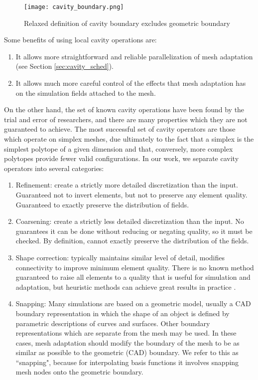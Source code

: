 \begin{figure}
\begin{center}
\texttt{[image: cavity\_boundary.png]}
\caption{Relaxed definition of cavity boundary excludes geometric boundary}
\label{fig:cavity_boundary}
\end{center}
\end{figure}

Some benefits of using local cavity operations are:
\begin{enumerate}
\item It allows more straightforward and reliable parallelization of
mesh adaptation (see Section \ref{sec:cavity_sched}).
\item It allows much more careful control of the effects that mesh
adaptation has on the simulation fields attached to the mesh.
\end{enumerate}

On the other hand, the set of known cavity operations
have been found by the trial and error of researchers,
and there are many properties which they are not guaranteed to
achieve.
The most successful set of cavity operators are those
which operate on simplex meshes, due ultimately to the
fact that a simplex is the simplest polytope of a given dimension
and that, conversely, more complex polytopes provide fewer
valid configurations.
In our work, we separate cavity operators into several categories:
\begin{enumerate}
\item Refinement: create a strictly more detailed discretization
than the input. Guaranteed not to invert elements, but not to
preserve any element quality. Guaranteed to exactly preserve
the distribution of fields.
\item Coarsening: create a strictly less detailed discretization
than the input. No guarantees it can be done without reducing
or negating quality, so it must be checked.
By definition, cannot exactly preserve the distribution of the fields.
\item Shape correction: typically maintains similar level of detail,
modifies connectivity to improve minimum element quality.
There is no known method guaranteed to raise all elements to a quality
that is useful for simulation and adaptation, but heuristic
methods can achieve great results in practice \cite{klingner2008aggressive}.
\item Snapping: Many simulations are based on a geometric model, usually a CAD
boundary representation in which the shape of an object is defined
by parametric descriptions of curves and surfaces.
Other boundary representations which are separate from the mesh
may be used.
In these cases, mesh adaptation should modify the boundary of the
mesh to be as similar as possible to the geometric (CAD) boundary.
We refer to this as ``snapping", because for interpolating basis
functions it involves snapping mesh nodes onto the geometric boundary.
\end{enumerate}


